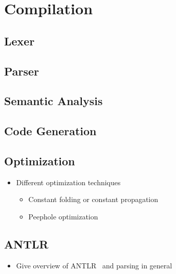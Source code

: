 \section{Compilation}

\subsection{Lexer}

\subsection{Parser}

\subsection{Semantic Analysis}

\subsection{Code Generation}

\subsection{Optimization}
\label{sec:background_compiler_codeOptimization}
\begin{itemize}
    \item Different optimization techniques
    \begin{itemize}
        \item Constant folding or constant propagation
        \item Peephole optimization
    \end{itemize}
\end{itemize}

\subsection{ANTLR}
\begin{itemize}
    \item Give overview of ANTLR~\cite{PaQu95} and parsing in general
\end{itemize}